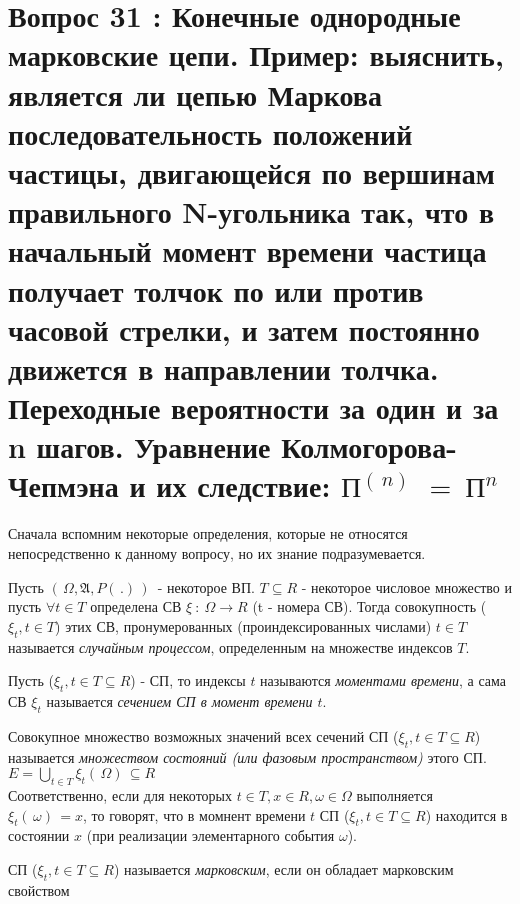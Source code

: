 \section{Вопрос 31 : Конечные однородные марковские цепи.
Пример: выяснить, является ли цепью Маркова последовательность положений частицы, двигающейся по
вершинам правильного N-угольника так, что в начальный момент времени частица получает толчок по или против часовой стрелки,
и затем постоянно движется в направлении толчка.
Переходные вероятности за один и за n шагов. Уравнение Колмогорова-Чепмэна и их следствие: $\text{П}^{( \,n) \,} \ = \ \text{П}^{n}$
}

Сначала вспомним некоторые определения, которые не относятся непосредственно к данному вопросу, но их знание подразумевается.

\begin{defs}
  Пусть $( \,\Omega, \mathfrak{A}, P( \,.) \,) \,$ - некоторое ВП. $T \subseteq R$ - некоторое числовое множество
  и пусть $\forall t \in T$ определена СВ $\xi \ : \ \Omega \to R$ (t - номера СВ).
  Тогда совокупность ($\xi_t, t \in T$) этих СВ, пронумерованных (проиндексированных числами) $t \in T$ называется
  \textit{случайным процессом}, определенным на множестве индексов $T$.
\end{defs}

\begin{defs}[Сечение]
  Пусть ($\xi_t, t \in T \subseteq R$) - СП, то индексы $t$ называются \textit{моментами времени}, а сама СВ $\xi_t$ называется
  \textit{сечением СП в момент времени $t$}.
\end{defs}

\begin{defs}
  Совокупное множество возможных значений всех сечений СП ($\xi_t, t \in T \subseteq R$)
  называется \textit{множеством состояний (или фазовым пространством)} этого СП.
  $E = \bigcup\limits_{t \in T}\xi_t( \, \Omega) \, \subseteq R$\\
  Соответственно, если для некоторых $t \in T, x \in R, \omega \in \Omega$ выполняется
  $\xi_t( \,\omega) \,=x$, то говорят, что в момнент времени $t$ СП ($\xi_t, t \in T \subseteq R$)
  находится в состоянии $x$ (при реализации элементарного события $\omega$).
\end{defs}

\begin{defs}[Марковский СП]
  СП ($\xi_t, t \in T \subseteq R$) называется \textit{марковским}, если он обладает марковским свойством
\end{defs}

